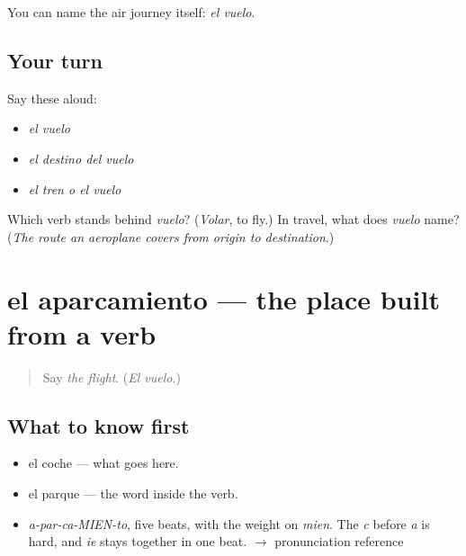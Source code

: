 \begin{grammarlens}[title={What you've built}]
You can name the air journey itself: \emph{el vuelo}.
\end{grammarlens}

\subsection*{Your turn}
Say these aloud:

\begin{itemize}
\raggedright
  \item \emph{el vuelo}
  \item \emph{el destino del vuelo}
  \item \emph{el tren o el vuelo}
\end{itemize}

\begin{tcolorbox}[breakable,colback=teal!4,colframe=teal!35!black,title={Before you move on}]
Which verb stands behind \emph{vuelo}? (\emph{Volar}, to fly.) In travel, what does \emph{vuelo} name? (\emph{The route an aeroplane covers from origin to destination}.)
\end{tcolorbox}
\section[el aparcamiento]{el aparcamiento — the place built from a verb}

\label{lesson:ES-C400-aparcamiento}



\begin{quote}
Say \emph{the flight}. (\emph{El vuelo}.)
\end{quote}

\subsection*{What to know first}
\begin{itemize}
\raggedright
  \item el coche — what goes here.
  \item el parque — the word inside the verb.
\end{itemize}

\begin{sounds}
\begin{itemize}
\raggedright
  \item \emph{a-par-ca-MIEN-to}, five beats, with the weight on \emph{mien}. The \emph{c} before \emph{a} is hard, and \emph{ie} stays together in one beat. $\to$ pronunciation reference
\end{itemize}
\end{sounds}

